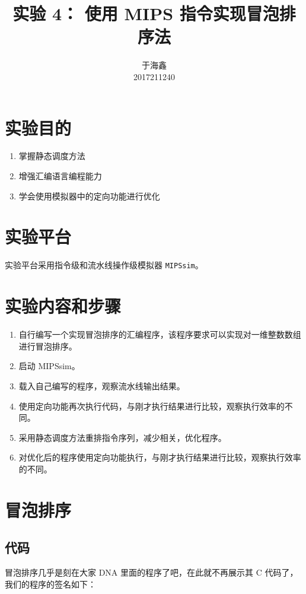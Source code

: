 \documentclass[blue,normal,cn]{elegantnote}
\title{实验 4： 使用 MIPS 指令实现冒泡排序法}
\date{\zhtoday}
\newcommand{\code}[1]{\colorbox{light-gray}{\texttt{#1}}}
\begin{document}
\author{
    \begin{tabular}[t]{c}
        于海鑫 \\
        2017211240
    \end{tabular}
}
\maketitle

\section{实验目的}
\begin{enumerate}
    \item 掌握静态调度方法
    \item 增强汇编语言编程能力
    \item 学会使用模拟器中的定向功能进行优化
\end{enumerate}

\section{实验平台}

实验平台采用指令级和流水线操作级模拟器 \code{MIPSsim}。

\section{实验内容和步骤}

\begin{enumerate}[wide=0pt, listparindent=2em, parsep=0pt]
    \item 自行编写一个实现冒泡排序的汇编程序，该程序要求可以实现对一维整数数组进行冒泡排序。
    \item 启动 MIPSsim。
    \item 载入自己编写的程序，观察流水线输出结果。
    \item 使用定向功能再次执行代码，与刚才执行结果进行比较，观察执行效率的不同。
    \item 采用静态调度方法重排指令序列，减少相关，优化程序。
    \item 对优化后的程序使用定向功能执行，与刚才执行结果进行比较，观察执行效率的不同。
\end{enumerate}

\section{冒泡排序}

\subsection{代码}
冒泡排序几乎是刻在大家 DNA 里面的程序了吧，在此就不再展示其 C 代码了，我们的程序的签名如下：
\end{document}

